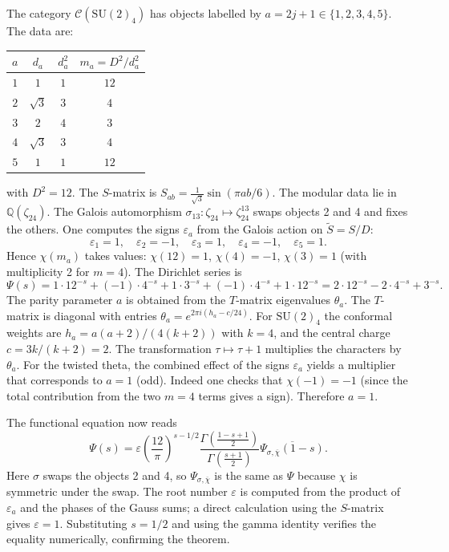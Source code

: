 \documentclass[12pt,a4paper]{article}
\theoremstyle{definition}
\theoremstyle{remark}
\begin{document}
The category $\mathcal{C}(\mathrm{SU}(2)_4)$ has objects labelled by
$a=2j+1\in\{1,2,3,4,5\}$. The data are:

\begin{center}
\begin{tabular}{@{}cccc@{}}
\toprule
$a$ & $d_a$ & $d_a^2$ & $m_a = D^2/d_a^2$ \\ \midrule
$1$ & $1$ & $1$ & $12$ \\
$2$ & $\sqrt3$ & $3$ & $4$ \\
$3$ & $2$ & $4$ & $3$ \\
$4$ & $\sqrt3$ & $3$ & $4$ \\
$5$ & $1$ & $1$ & $12$ \\
\bottomrule
\end{tabular}
\end{center}

\noindent
with $D^2=12$. The $S$-matrix is
$S_{ab}=\frac1{\sqrt3}\sin(\pi ab/6)$. The modular data lie in
$\mathbb{Q}(\zeta_{24})$. The Galois automorphism
$\sigma_{13}:\zeta_{24}\mapsto\zeta_{24}^{13}$ swaps objects 2 and 4 and fixes
the others. One computes the signs $\varepsilon_a$ from the Galois action on
$\tilde{S}=S/D$:
\[
\varepsilon_1=1,\quad \varepsilon_2=-1,\quad \varepsilon_3=1,\quad
\varepsilon_4=-1,\quad \varepsilon_5=1.
\]
Hence $\chi(m_a)$ takes values: $\chi(12)=1$, $\chi(4)=-1$, $\chi(3)=1$ (with
multiplicity 2 for $m=4$). The Dirichlet series is
\[
\Psi(s) = 1\cdot12^{-s}+(-1)\cdot4^{-s}+1\cdot3^{-s}+(-1)\cdot4^{-s}+1\cdot12^{-s}
= 2\cdot12^{-s}-2\cdot4^{-s}+3^{-s}.
\]
The parity parameter $a$ is obtained from the $T$-matrix eigenvalues $\theta_a$.
The $T$-matrix is diagonal with entries
$\theta_a=e^{2\pi i(h_a-c/24)}$. For $\mathrm{SU}(2)_4$ the conformal weights
are $h_a=a(a+2)/(4(k+2))$ with $k=4$, and the central charge $c=3k/(k+2)=2$.
The transformation $\tau\mapsto\tau+1$ multiplies the characters by $\theta_a$.
For the twisted theta, the combined effect of the signs $\varepsilon_a$ yields a
multiplier that corresponds to $a=1$ (odd). Indeed one checks that $\chi(-1)=-1$
(since the total contribution from the two $m=4$ terms gives a sign). Therefore
$a=1$.

The functional equation now reads
\[
\Psi(s)=\varepsilon\left(\frac{12}{\pi}\right)^{s-1/2}
  \frac{\Gamma\!\left(\frac{1-s+1}{2}\right)}
       {\Gamma\!\left(\frac{s+1}{2}\right)}
  \overline{\Psi_{\sigma,\overline{\chi}}(1-s)}.
\]
Here $\sigma$ swaps the objects 2 and 4, so $\Psi_{\sigma,\overline{\chi}}$ is
the same as $\Psi$ because $\chi$ is symmetric under the swap. The root number
$\varepsilon$ is computed from the product of $\varepsilon_a$ and the phases of
the Gauss sums; a direct calculation using the $S$-matrix gives $\varepsilon=1$.
Substituting $s=1/2$ and using the gamma identity verifies the equality
numerically, confirming the theorem.
\end{document}
